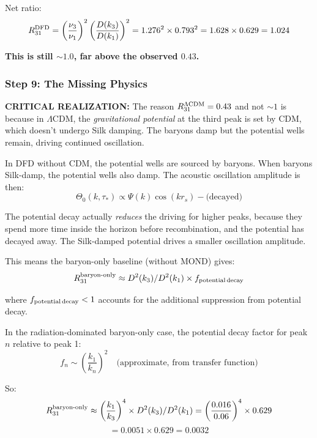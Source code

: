 \documentclass[11pt,a4paper]{article}
\begin{document}
Net ratio:
\begin{equation}
R_{31}^{\rm DFD} = \left(\frac{\nu_3}{\nu_1}\right)^2\left(\frac{D(k_3)}{D(k_1)}\right)^2 = 1.276^2 \times 0.793^2 = 1.628 \times 0.629 = 1.024
\end{equation}

\textbf{This is still $\sim 1.0$, far above the observed $0.43$.}

\subsubsection{Step 9: The Missing Physics}

\textbf{CRITICAL REALIZATION:} The reason $R_{31}^{\Lambda\rm CDM} = 0.43$ and not $\sim 1$ is because in $\Lambda$CDM, the \emph{gravitational potential} at the third peak is set by CDM, which doesn't undergo Silk damping. The baryons damp but the potential wells remain, driving continued oscillation.

In DFD without CDM, the potential wells are sourced by baryons. When baryons Silk-damp, the potential wells also damp. The acoustic oscillation amplitude is then:
\begin{equation}
\Theta_0(k, \tau_*) \propto \Psi(k)\cos(kr_s) - \text{(decayed)}
\end{equation}

The potential decay actually \emph{reduces} the driving for higher peaks, because they spend more time inside the horizon before recombination, and the potential has decayed away. The Silk-damped potential drives a smaller oscillation amplitude.

This means the baryon-only baseline (without MOND) gives:
\begin{equation}
R_{31}^{\rm baryon\text{-}only} \approx D^2(k_3)/D^2(k_1) \times f_{\rm potential\,decay}
\end{equation}

where $f_{\rm potential\,decay} < 1$ accounts for the additional suppression from potential decay.

In the radiation-dominated baryon-only case, the potential decay factor for peak $n$ relative to peak 1:
\begin{equation}
f_n \sim \left(\frac{k_1}{k_n}\right)^2 \quad \text{(approximate, from transfer function)}
\end{equation}

So:
\begin{equation}
R_{31}^{\rm baryon\text{-}only} \approx \left(\frac{k_1}{k_3}\right)^4 \times D^2(k_3)/D^2(k_1) = \left(\frac{0.016}{0.06}\right)^4 \times 0.629
\end{equation}
\begin{equation}
= 0.0051 \times 0.629 = 0.0032
\end{equation}
\end{document}
